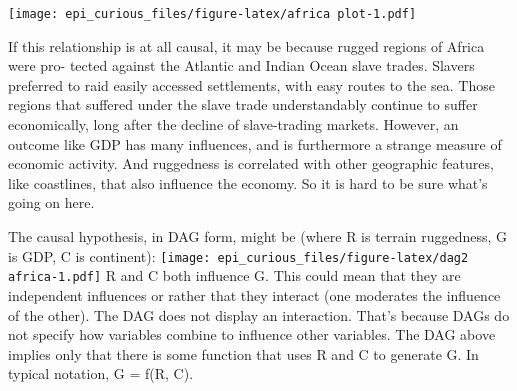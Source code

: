 \documentclass[
]{article}
\newenvironment{Shaded}{\begin{snugshade}}{\end{snugshade}}
\newcommand{\CommentTok}[1]{\textcolor[rgb]{0.56,0.35,0.01}{\textit{#1}}}
\newcommand{\DataTypeTok}[1]{\textcolor[rgb]{0.13,0.29,0.53}{#1}}
\newcommand{\DecValTok}[1]{\textcolor[rgb]{0.00,0.00,0.81}{#1}}
\newcommand{\KeywordTok}[1]{\textcolor[rgb]{0.13,0.29,0.53}{\textbf{#1}}}
\newcommand{\NormalTok}[1]{#1}
\newcommand{\OperatorTok}[1]{\textcolor[rgb]{0.81,0.36,0.00}{\textbf{#1}}}
\newcommand{\StringTok}[1]{\textcolor[rgb]{0.31,0.60,0.02}{#1}}
\begin{document}
\begin{Shaded}
\end{Shaded}

\texttt{[image: epi\_curious\_files/figure-latex/africa plot-1.pdf]}

If this relationship is at all causal, it may be because rugged regions
of Africa were pro- tected against the Atlantic and Indian Ocean slave
trades. Slavers preferred to raid easily accessed settlements, with easy
routes to the sea. Those regions that suffered under the slave trade
understandably continue to suffer economically, long after the decline
of slave-trading markets. However, an outcome like GDP has many
influences, and is furthermore a strange measure of economic activity.
And ruggedness is correlated with other geographic features, like
coastlines, that also influence the economy. So it is hard to be sure
what's going on here.

The causal hypothesis, in DAG form, might be (where R is terrain
ruggedness, G is GDP, C is continent):
\texttt{[image: epi\_curious\_files/figure-latex/dag2 africa-1.pdf]} R and
C both influence G. This could mean that they are independent influences
or rather that they interact (one moderates the influence of the other).
The DAG does not display an interaction. That's because DAGs do not
specify how variables combine to influence other variables. The DAG
above implies only that there is some function that uses R and C to
generate G. In typical notation, G = f(R, C).
\end{document}
